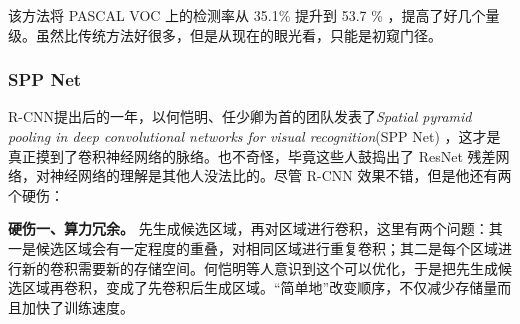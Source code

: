 该方法将 PASCAL VOC 上的检测率从 35.1\% 提升到 53.7 \% ，提高了好几个量级。虽然比传统方法好很多，但是从现在的眼光看，只能是初窥门径。

\subsubsection{SPP Net}
R-CNN提出后的一年，以何恺明、任少卿为首的团队发表了\textit{Spatial pyramid pooling in deep convolutional networks for visual recognition}(SPP Net)\cite{sppnet} ，这才是真正摸到了卷积神经网络的脉络。也不奇怪，毕竟这些人鼓捣出了 ResNet 残差网络，对神经网络的理解是其他人没法比的。尽管 R-CNN 效果不错，但是他还有两个硬伤：

\textbf{硬伤一、算力冗余。}
先生成候选区域，再对区域进行卷积，这里有两个问题：其一是候选区域会有一定程度的重叠，对相同区域进行重复卷积；其二是每个区域进行新的卷积需要新的存储空间。何恺明等人意识到这个可以优化，于是把先生成候选区域再卷积，变成了先卷积后生成区域。“简单地”改变顺序，不仅减少存储量而且加快了训练速度。


